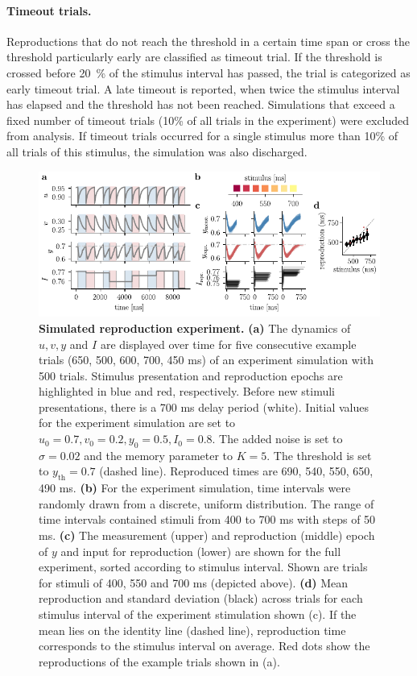 \documentclass[10pt]{article}
\begin{document}
\paragraph{Timeout trials.}
Reproductions that do not reach the threshold in a certain time span or cross the threshold particularly early are classified as timeout trial.
If the threshold is crossed before 20~\% of the stimulus interval has passed, the trial is categorized as early timeout trial.
A late timeout is reported, when twice the stimulus interval has elapsed and the threshold has not been reached.
Simulations that exceed a fixed number of timeout trials (10\% of all trials in the experiment) were excluded from analysis.
If timeout trials occurred for a single stimulus more than 10\% of all trials of this stimulus, the simulation was also discharged.

\begin{figure}[ht]
	\centering
	\includegraphics{figures/trial.pdf}
	\caption{\textbf{Simulated reproduction experiment.} 
	\textbf{(a)} The dynamics of $u, v, y $ and $I$ are displayed over time for five consecutive example trials (650, 500, 600, 700, 450 ms) of an experiment simulation with 500 trials. Stimulus presentation and reproduction epochs are highlighted in blue and red, respectively. Before new stimuli presentations, there is a 700 ms delay period (white). Initial values for the experiment simulation are set to $u_0=0.7, v_0=0.2, y_0=0.5, I_0=0.8$. The added noise is set to $\sigma=0.02$ and the memory parameter to $K=5$. The threshold is set to $y_{\text{th}}=0.7$ (dashed line). Reproduced times are 690, 540, 550, 650, 490 ms.
	\textbf{(b)} For the experiment simulation, time intervals were randomly drawn from a discrete, uniform distribution. The range of time intervals contained stimuli from 400 to 700 ms with steps of 50 ms.
	\textbf{(c)} The measurement (upper) and reproduction (middle) epoch of $y$ and input for reproduction (lower) are shown for the full experiment, sorted according to stimulus interval. Shown are trials for stimuli of 400, 550 and 700 ms (depicted above).
	\textbf{(d)} Mean reproduction and standard deviation (black) across trials for each stimulus interval of the experiment stimulation shown (c). If the mean lies on the identity line (dashed line), reproduction time corresponds to the stimulus interval on average. Red dots show the reproductions of the example trials shown in (a). 
	}
\label{fig:experiment}
\end{figure}
\end{document}
